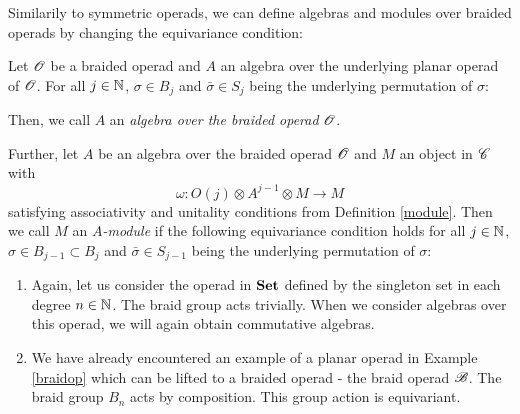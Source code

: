 \begin{rem}
    Similarily to symmetric operads, we can define algebras and modules over
    braided operads by changing the equivariance condition:

    Let $\mathscr{O}$ be a braided operad and $A$ an algebra over the underlying planar
    operad of $\mathscr{O}$. For all $j \in \mathbb{N}$, $\sigma \in B_j$ and $\bar{\sigma} \in
    S_j$ being the underlying permutation of $\sigma$:
    \begin{center}
    \end{center}
    Then, we call $A$ an \emph{algebra over the braided operad} $\mathscr{O}$.

    Further, let $A$ be an algebra over the braided operad $\mathscr{O}$ and $M$ an
    object in $\mathscr{C}$ with
    \[
        \omega \colon O(j) \otimes A^{j-1} \otimes M \rightarrow M 
    \]
    satisfying associativity and unitality conditions from Definition
    \ref{module}. Then we call $M$ an \emph{$A$-module} if the following equivariance
    condition holds for all $j \in \mathbb{N}$, $\sigma \in B_{j-1} \subset B_j$ and
    $\bar{\sigma} \in S_{j-1}$ being the underlying permutation of $\sigma$:

    \begin{center}
                \end{center}
\end{rem}

\begin{eg}\label{eg:braidedoperads}
    \begin{enumerate}
        \item Again, let us consider the operad in $\operatorname{\textbf{Set}}$ defined by the
        singleton set in each degree $n \in \mathbb{N}$. The braid group acts trivially.
        When we consider algebras over this operad, we will again obtain
        commutative algebras.
        \item We have already encountered an example of a planar operad in
        Example \ref{braidop} which can be lifted to a braided operad - the
        braid operad $\mathscr{B}$. The braid group $B_n$ acts by composition. This group
        action is equivariant.
    \end{enumerate}
    
\end{eg}

